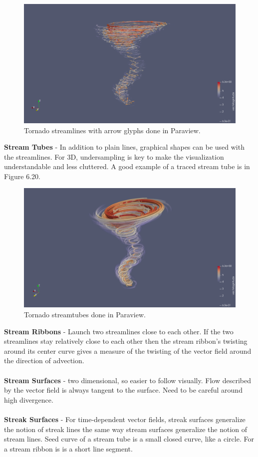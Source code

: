 \documentclass{article}
\begin{document}
\begin{figure}[H]
\caption{Tornado streamlines with arrow glyphs done in Paraview.}
\centering
\includegraphics[scale=.35]{tornado_glyphs_streamlines_pv.png}
\end{figure}


\textbf{Stream Tubes} - In addition to plain lines, graphical shapes can be used with the streamlines. For 3D, undersampling is key to make the visualization understandable and less cluttered. A good example of a traced stream tube is in Figure 6.20.

\begin{figure}[H]
\caption{Tornado streamtubes done in Paraview.}
\centering
\includegraphics[scale=.35]{tornado_stream_tubes_pv.png}
\end{figure}

\textbf{Stream Ribbons} - Launch two streamlines close to each other. If the two streamlines stay relatively close to each other then the stream ribbon's twisting around its center curve gives a measure of the twisting of the vector field around the direction of advection. %
\\\\
\textbf{Stream Surfaces} - two dimensional, so easier to follow visually. Flow described by the vector field is always tangent to the surface. Need to be careful around high divergence. 
\\\\
\textbf{Streak Surfaces} - For time-dependent vector fields, streak surfaces generalize the notion of streak lines the same way stream surfaces generalize the notion of stream lines. Seed curve of a stream tube is a small closed curve, like a circle. For a stream ribbon is is a short line segment. 
\end{document}
